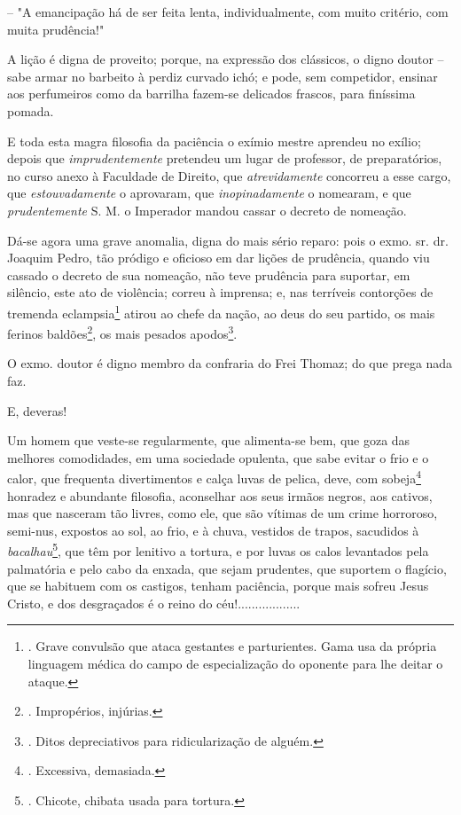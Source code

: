 -- "A emancipação há de ser feita lenta, individualmente, com muito
critério, com muita prudência!"

A lição é digna de proveito; porque, na expressão dos clássicos, o digno
doutor -- sabe armar no barbeito à perdiz curvado ichó; e pode, sem
competidor, ensinar aos perfumeiros como da barrilha fazem-se delicados
frascos, para finíssima pomada.

E toda esta magra filosofia da paciência o exímio mestre aprendeu no
exílio; depois que \emph{imprudentemente} pretendeu um lugar de
professor, de preparatórios, no curso anexo à Faculdade de Direito, que
\emph{atrevidamente} concorreu a esse cargo, que \emph{estouvadamente} o
aprovaram, que \emph{inopinadamente} o nomearam, e que
\emph{prudentemente} S. M. o Imperador mandou cassar o decreto de
nomeação.

Dá-se agora uma grave anomalia, digna do mais sério reparo: pois o exmo.
sr. dr. Joaquim Pedro, tão pródigo e oficioso em dar lições de
prudência, quando viu cassado o decreto de sua nomeação, não teve
prudência para suportar, em silêncio, este ato de violência; correu à
imprensa; e, nas terríveis contorções de tremenda eclampsia\footnote{.
  Grave convulsão que ataca gestantes e parturientes. Gama usa da
  própria linguagem médica do campo de especialização do oponente para
  lhe deitar o ataque.} atirou ao chefe da nação, ao deus do seu
partido, os mais ferinos baldões\footnote{. Impropérios, injúrias.}, os
mais pesados apodos\footnote{. Ditos depreciativos para ridicularização
  de alguém.}.

O exmo. doutor é digno membro da confraria do Frei Thomaz; do que prega
nada faz.

E, deveras!

Um homem que veste-se regularmente, que alimenta-se bem, que goza das
melhores comodidades, em uma sociedade opulenta, que sabe evitar o frio
e o calor, que frequenta divertimentos e calça luvas de pelica, deve,
com sobeja\footnote{. Excessiva, demasiada.} honradez e abundante
filosofia, aconselhar aos seus irmãos negros, aos cativos, mas que
nasceram tão livres, como ele, que são vítimas de um crime horroroso,
semi-nus, expostos ao sol, ao frio, e à chuva, vestidos de trapos,
sacudidos à \emph{bacalhau}\footnote{. Chicote, chibata usada para
  tortura.}, que têm por lenitivo a tortura, e por luvas os calos
levantados pela palmatória e pelo cabo da enxada, que sejam prudentes,
que suportem o flagício, que se habituem com os castigos, tenham
paciência, porque mais sofreu Jesus Cristo, e dos desgraçados é o reino
do céu!..................


